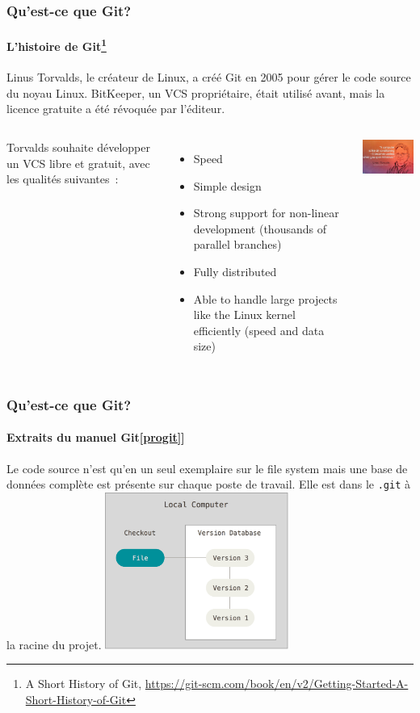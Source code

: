 \documentclass{beamer}
\begin{document}
    \begin{frame}
        \frametitle{Qu'est-ce que Git?}
        \framesubtitle{L'histoire de Git\footnote{A Short History of Git, \url{https://git-scm.com/book/en/v2/Getting-Started-A-Short-History-of-Git}}}
        \transdissolve
        Linus Torvalds, le créateur de Linux, a créé Git en 2005 pour gérer le code source du noyau Linux.
        BitKeeper, un VCS propriétaire, était utilisé avant, mais la licence gratuite a été révoquée par l'éditeur.
        \smallbreak
        \begin{columns}
            Torvalds souhaite développer un VCS libre et gratuit, avec les qualités suivantes~:
            \begin{itemize}
                \item Speed
                \item Simple design
                \item Strong support for non-linear development (thousands of parallel branches)
                \item Fully distributed
                \item Able to handle large projects like the Linux kernel efficiently (speed and data size)
            \end{itemize}
            \centering
            \includegraphics[width=4.5cm]{image/linus-quote.jpeg}
        \end{columns}
    \end{frame}

    \begin{frame}
        \frametitle{Qu'est-ce que Git?}
        \framesubtitle{Extraits du manuel Git\cref{progit}]}
        \transdissolve
        Le code source n'est qu'en un seul exemplaire sur le file system mais une base de données complète est présente sur chaque poste de travail.
        Elle est dans le \lstinline{.git} à la racine du projet.
        \bigbreak
        \centering
        \includegraphics[width=6cm]{image/git-local-history.png}
    \end{frame}
\end{document}
